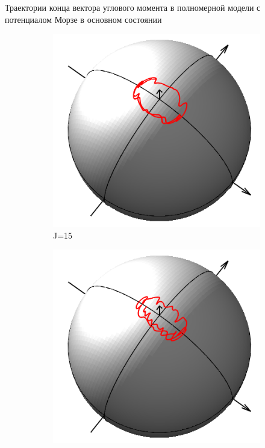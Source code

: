 \documentclass[hyperref={pdfpagelabels=false},usepdftitle=false, xcolor = dvipsnames]{beamer}
\begin{document}
\begin{frame}{\small Траектории конца вектора углового момента в полномерной модели с потенциалом Морзе в основном состоянии}
  \begin{block}{}
  	\begin{figure}
	  \begin{subfigure}{0.25\textwidth}
	    \includegraphics[width = \linewidth]{../pictures/MorseGroundState00/plot_J=15.png}
	    \caption{J=15}
	  \end{subfigure}
	  \begin{subfigure}{0.25\textwidth}
	    \includegraphics[width = \linewidth]{../pictures/MorseGroundState00/plot_J=20.png}

\end{subfigure}
\end{figure}
\end{block}
\end{frame}
\end{document}
